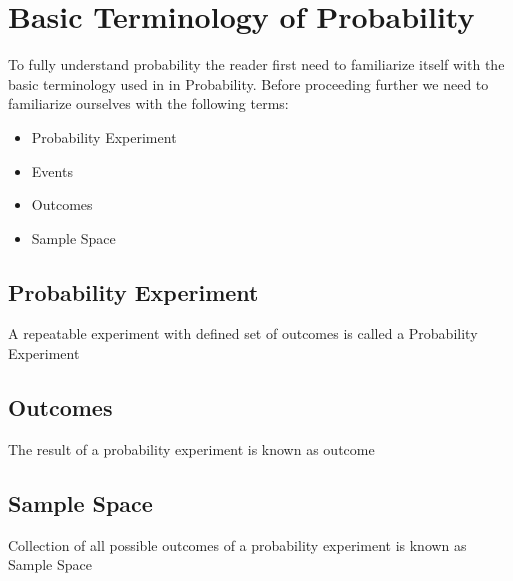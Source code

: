 \documentclass[twoside,12pt]{report}  %
\begin{document}
\section{Basic Terminology of Probability}

To fully understand probability the reader first need to familiarize itself with the basic terminology used in in Probability. Before proceeding further we need to familiarize ourselves with the following terms:
\begin{itemize}
	\item Probability Experiment
	\item Events
	\item Outcomes
	\item Sample Space
\end{itemize}

\subsection{Probability Experiment}

\begin{tcolorbox}[colback=red!5!white, colframe=red!75!black, title = \textbf{Probability Experiment}]
	A repeatable experiment with defined set of outcomes is called a Probability Experiment	
\end{tcolorbox}

\subsection{Outcomes}
\begin{tcolorbox}[colback=red!5!white, colframe=red!75!black, title = \textbf{Outcomes}]
	The result of a probability experiment is known as outcome
\end{tcolorbox}


\subsection{Sample Space}
\begin{tcolorbox}[colback=red!5!white, colframe=red!75!black, title = \textbf{Sample Space}]
	Collection of all possible outcomes of a probability experiment is known as Sample Space
\end{tcolorbox}
\end{document}
